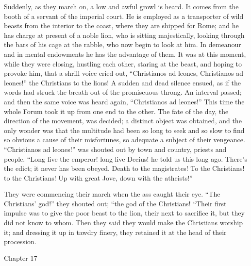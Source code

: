 Suddenly, as they march on, a low and awful growl is heard.
It comes from the booth of a servant of the imperial court. He is
employed as a transporter of wild beasts from the interior to the
coast, where they are shipped for Rome; and he has charge at present
of a noble lion, who is sitting majestically, looking through the bars
of his cage at the rabble, who now begin to look at him. In demeanour
and in mental endowments he has the advantage of them. It was at this
moment, while they were closing, hustling each other, staring at the
beast, and hoping to provoke him, that a shrill voice cried out,
``Christianos ad leones, Christianos ad leones!'' the
Christians to the lions! A sudden and dead silence ensued, as if the
words had struck the breath out of the promiscuous throng. An interval
passed; and then the same voice was heard again, ``Christianos ad
leones!'' This time the whole Forum took it up from one end to the
other. The fate of the day, the direction of the movement, was
decided; a distinct object was obtained, and the only wonder was that
the multitude had been so long to seek and so slow to find so obvious
a cause of their misfortunes, so adequate a subject of their
vengeance. ``Christianos ad leones!'' was shouted out by town
and country, priests and people. ``Long live the emperor! long
live Decius! he told us this long ago. There's the edict; it never has
been obeyed. Death to the magistrates! To the Christians! to the
Christians! Up with great Jove, down with the atheists!''

They were commencing their march when the ass caught their eye.
``The Christians' god!'' they shouted out; ``the god of
the Christians! ``Their first impulse was to give the poor beast
to the lion, their next to sacrifice it, but they did not know to
whom. Then they said they would make the Christians worship it; and
dressing it up in tawdry finery, they retained it at the head of their
procession.

Chapter 17


